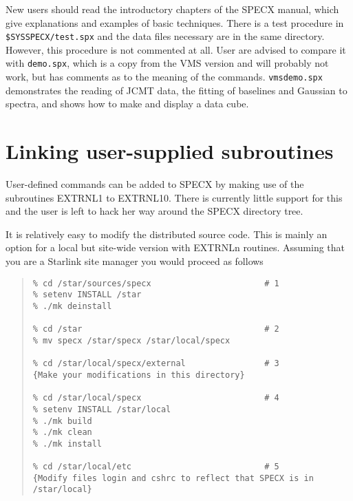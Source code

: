 \documentclass[twoside,11pt]{article}
\renewcommand{\_}{\texttt{\symbol{95}}}
\newenvironment{myquote}{\begin{quote}\begin{small}}{\end{small}\end{quote}}
\begin{document}
New users should read the introductory chapters of the SPECX manual,
which give explanations and examples of basic techniques. There is a
test procedure in {\tt \$SYS\_SPECX/test.spx} and the data files
necessary are in the same directory. However, this procedure is not
commented at all. User are advised to compare it with {\tt demo.spx},
which is a copy from the VMS version and will probably not work, but has
comments as to the meaning of the commands.
{\tt vms\_demo.spx} demonstrates the reading of JCMT data,
the fitting of baselines and Gaussian to spectra, and shows how to make
and display a data cube.


\section{Linking user-supplied subroutines}

User-defined commands can be added to SPECX by making use of the
subroutines EXTRNL1 to EXTRNL10. There is currently little support for
this and the user is left to hack her way around the SPECX directory
tree.

It is relatively easy to modify the distributed source code. This is
mainly an option for a local but site-wide version with EXTRNLn
routines. Assuming that you are a Starlink site manager you would
proceed as follows

\begin{myquote}
\begin{verbatim}
% cd /star/sources/specx                       # 1
% setenv INSTALL /star
% ./mk deinstall

% cd /star                                     # 2
% mv specx /star/specx /star/local/specx

% cd /star/local/specx/external                # 3
{Make your modifications in this directory}

% cd /star/local/specx                         # 4
% setenv INSTALL /star/local
% ./mk build
% ./mk clean
% ./mk install

% cd /star/local/etc                           # 5
{Modify files login and cshrc to reflect that SPECX is in /star/local}
\end{verbatim}
\end{myquote}
\end{document}
